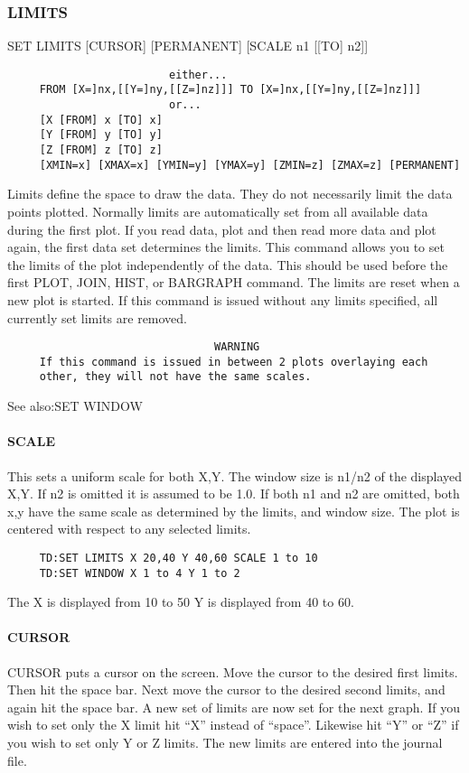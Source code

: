 \subsubsection{LIMITS}
SET LIMITS [CURSOR] [PERMANENT] [SCALE n1 [[TO] n2]] 
\begin{verbatim}
                         either...  
     FROM [X=]nx,[[Y=]ny,[[Z=]nz]]] TO [X=]nx,[[Y=]ny,[[Z=]nz]]] 
                         or...  
     [X [FROM] x [TO] x] 
     [Y [FROM] y [TO] y] 
     [Z [FROM] z [TO] z] 
     [XMIN=x] [XMAX=x] [YMIN=y] [YMAX=y] [ZMIN=z] [ZMAX=z] [PERMANENT] 
\end{verbatim}
Limits define the space to draw the data.  They do not necessarily
limit the data points plotted.  Normally limits are automatically set
from all available data during the first plot.  If you read data, plot
and then read more data and plot again, the first data set determines
the limits.  This command allows you to set the limits of the plot
independently of the data.  This should be used before the first PLOT,
JOIN, HIST, or BARGRAPH command.  The limits are reset when a new plot
is started.  If this command is issued without any limits specified,
all currently set limits are removed.  
\begin{verbatim}
                                WARNING
     If this command is issued in between 2 plots overlaying each
     other, they will not have the same scales.  
\end{verbatim}

See also:SET WINDOW 
\paragraph{SCALE}
This sets a uniform scale for both X,Y.  The window size is n1/n2 of
the displayed X,Y.  If n2 is omitted it is assumed to be 1.0.  If
both n1 and n2 are omitted, both x,y have the same scale as
determined by the limits, and window size.  The plot is centered with
respect to any selected limits.  
\begin{verbatim}
     TD:SET LIMITS X 20,40 Y 40,60 SCALE 1 to 10 
     TD:SET WINDOW X 1 to 4 Y 1 to 2 
\end{verbatim}
The X is displayed from 10 to 50 Y is displayed from 40 to 60.  
\paragraph{CURSOR}
CURSOR puts a cursor on the screen.  Move the cursor to the desired
first limits.  Then hit the space bar.  Next move the cursor to the
desired second limits, and again hit the space bar.  A new set of
limits are now set for the next graph.  If you wish to set only the X
limit hit ``X'' instead of ``space''.  Likewise hit ``Y'' or ``Z'' if you
wish to set only Y or Z limits.  The new limits are entered into the
journal file.  

